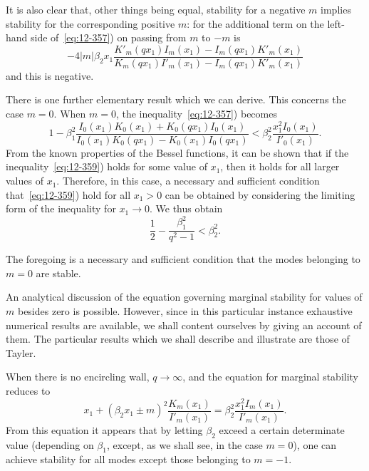 It is also clear that, other things being equal, stability for a negative $m$ implies stability for the corresponding positive $m$: for the additional term on the left-hand side of~\eqref{eq:12-357}) on passing from $m$ to $-m$ is
\begin{equation}
\label{eq:12-358}
-4|m|\beta_2 x_1 \frac{K'_m(qx_1)I_m(x_1)-I_m(qx_1)K'_m(x_1)}{K_m(qx_1)I'_m(x_1)-I_m(qx_1)K'_m(x_1)}
\end{equation}
and this is negative.

There is one further elementary result which we can derive. This concerns the case $m = 0$. When $m = 0$, the inequality~\eqref{eq:12-357}) becomes
\begin{equation}
\label{eq:12-359}
1-\beta_1^2\frac{I_0(x_1)K_0(x_1)+K_0(qx_1)I_0(x_1)}{I_0(x_1)K_0(qx_1)-K_0(x_1)I_0(qx_1)} < \beta_2^2\frac{x_1^2 I_0(x_1)}{I'_0(x_1)}.
\end{equation}
From the known properties of the Bessel functions, it can be shown that if the inequality~\eqref{eq:12-359}) holds for some value of $x_1$, then it holds for all larger values of $x_1$. Therefore, in this case, a necessary and sufficient condition that~\eqref{eq:12-359}) hold for all $x_1 > 0$ can be obtained by considering the limiting form of the inequality for $x_1 \to 0$. We thus obtain
\begin{equation}
\label{eq:12-360}
\frac{1}{2} - \frac{\beta_1^2}{q^2-1} < \beta_2^2.
\end{equation}

The foregoing is a necessary and sufficient condition that the modes belonging to $m = 0$ are stable.

An analytical discussion of the equation governing marginal stability for values of $m$ besides zero is possible. However, since in this particular instance exhaustive numerical results are available, we shall content ourselves by giving an account of them. The particular results which we shall describe and illustrate are those of Tayler.

When there is no encircling wall, $q \to \infty$, and the equation for marginal stability reduces to
\begin{equation}
\label{eq:12-361}
x_1 + (\beta_2 x_1 \pm m)^2 \frac{K_m(x_1)}{I'_m(x_1)} = \beta_2^2 \frac{x_1^2 I_m(x_1)}{I'_m(x_1)}.
\end{equation}
From this equation it appears that by letting $\beta_2$ exceed a certain determinate value (depending on $\beta_1$, except, as we shall see, in the case $m = 0$), one can achieve stability for all modes except those belonging to $m = -1$.


